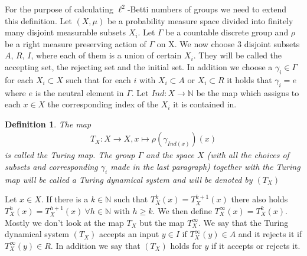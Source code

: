 \documentclass[12pt,a4paper]{scrartcl}
\newtheorem{Definition}[Theorem]{Definition}
\numberwithin{equation}{section}
\newcommand{\N}{\mathbb{N}} %
\newcommand{\2}{\mathbb{Z} / 2 \mathbb{Z}}
\newcommand{\1}{\bar{1}}
\newcommand{\0}{\bar{0}}
\begin{document}
For the purpose of calculating $\ell^2$-Betti numbers of groups we need to extend this definition. Let $(X, \mu)$ be a probability measure space divided into finitely many disjoint measurable subsets $X_i$. Let $\Gamma$ be a countable discrete group and $\rho$ be a right measure preserving action of $\Gamma$ on X.
We now choose 3 disjoint subsets $A$, $R$, $I$, where each of them is a union of certain $X_i$. They will be called the accepting set, the rejecting set and the initial set. In addition we choose a $\gamma_i \in \Gamma$ for each $X_i \subset X$ such that for each $i$ with $X_i \subset A$ or $X_i \subset R$ it holds that $\gamma_i = e$ where $e$ is the neutral element in $\Gamma$. 
Let $Ind: X \to \N$ be the map which assigns to each $x \in X$ the corresponding index of the $X_i$ it is contained in.
\begin{Definition}
	 The map 
	 \begin{align*}
	 T_X:X \to X, x \mapsto \rho(\gamma_{Ind(x)})(x)
	 \end{align*}
	 is called the Turing map.
	 The group $\Gamma$ and the space $X$ (with all the choices of subsets and corresponding $\gamma_i$ made in the last paragraph) together with the Turing map will be called a Turing dynamical system and will be denoted by $(T_X)$
\end{Definition}
Let $x \in X$. If there is a $k \in \N$ such that $T_X^k(x) = T_X^{k + 1}(x)$ there also holds $T_X^h(x) = T_X^{h + 1}(x) \ \forall h \in \N$ with $h \geq k$. We then define $T_X^\infty (x) = T_X^k(x)$. Mostly we don't look at the map $T_X$ but the map $T_X^\infty$. We say that the Turing dynamical system $(T_X)$ accepts an input $y \in I$ if $T_X^\infty(y) \in A$ and it rejects it if $T_X^\infty(y) \in R$. In addition we say that $(T_X)$ holds for $y$ if it accepts or rejects it.
\end{document}
